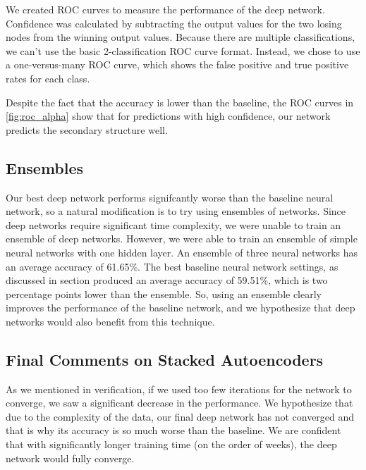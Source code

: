 \documentclass[letterpaper,twocolumn,12pt]{article}
\begin{document}
We created ROC curves to measure the performance of the deep network.
Confidence was calculated by subtracting the output values for the two losing nodes from the winning output values.
Because there are multiple classifications, we can't use the basic 2-classification ROC curve format.
Instead, we chose to use a one-versus-many ROC curve, which shows the false positive and true positive rates for each class.



Despite the fact that the accuracy is lower than the baseline, the ROC curves in \ref{fig:roc_alpha} show that for predictions with high confidence, our network predicts the secondary structure well.

\subsection{Ensembles}
Our best deep network performs signifcantly worse than the baseline neural network, so a natural modification is to try using ensembles of networks.
Since deep networks require significant time complexity, we were unable to train an ensemble of deep networks.
However, we were able to train an ensemble of simple neural networks with one hidden layer.
An ensemble of three neural networks has an average accuracy of 61.65\%.
The best baseline neural network settings, as discussed in section %
produced an average accuracy of 59.51\%, which is two percentage points lower than the ensemble.
So, using an ensemble clearly improves the performance of the baseline network, and we hypothesize that deep networks would also benefit from this technique.



\subsection{Final Comments on Stacked Autoencoders}
As we mentioned in verification, if we used too few iterations for the network to converge, we saw a significant decrease in the performance.
We hypothesize that due to the complexity of the data, our final deep network has not converged and that is why its accuracy is so much worse than the baseline.
We are confident that with significantly longer training time (on the order of weeks), the deep network would fully converge.
\end{document}
